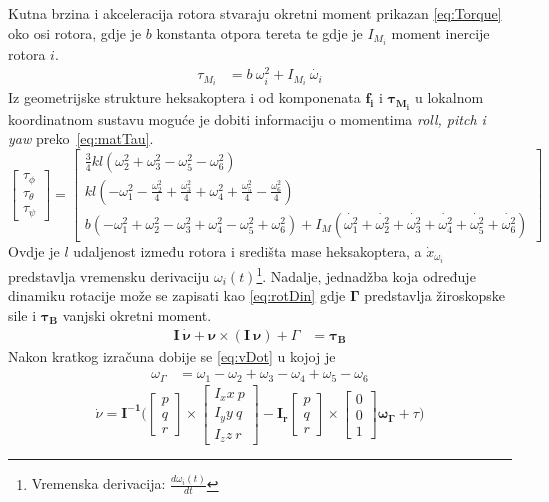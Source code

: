 \documentclass[times, utf8, diplomski]{fer}
\begin{document}
Kutna brzina i akceleracija rotora stvaraju okretni moment prikazan \ref{eq:Torque} oko osi rotora, gdje je $b$ konstanta otpora tereta te gdje je $I_{M_i}$ moment inercije rotora $i$.
\begin{align}
\tau_{M_i}&=b~\omega^2_i+I_{M_i}~\dot{\omega_i} \label{eq:Torque}
\end{align}
Iz geometrijske strukture heksakoptera i od komponenata $\mathbf{f_i}$ i $\mathbf{\tau_{M_i}}$ u lokalnom koordinatnom sustavu moguće je dobiti informaciju o momentima \emph{roll, pitch i yaw} preko~\ref{eq:matTau}.
\begin{equation}
	\begin{bmatrix}
	\tau_{\phi} \\
	\tau_{\theta} \\
	\tau_{\psi}
	\end{bmatrix}
	=
	\begin{bmatrix}
	\frac{3}{4}kl(\omega^2_2+\omega^2_3-\omega^2_5-\omega^2_6) \\
	kl(-\omega^2_1-\frac{\omega^2_2}{4}+\frac{\omega^2_3}{4}+\omega^2_4+\frac{\omega^2_5}{4}-\frac{\omega^2_6}{4}) \\
	b(-\omega^2_1+\omega^2_2-\omega^2_3+\omega^2_4-\omega^2_5+\omega^2_6)+I_M(\dot{\omega^2_1}+\dot{\omega^2_2}+\dot{\omega^2_3}+\dot{\omega^2_4}+\dot{\omega^2_5}+\dot{\omega^2_6})
	\end{bmatrix}
	\label{eq:matTau}
\end{equation}
Ovdje je $l$ udaljenost između rotora i središta mase heksakoptera, a $\dot{x}_{\omega_i}$ predstavlja vremensku derivaciju $\omega_i(t)$\footnote{Vremenska derivacija: $\frac{d\omega_i(t)}{dt}$}. Nadalje, jednadžba koja određuje dinamiku rotacije može se zapisati kao \ref{eq:rotDin} gdje $\mathbf{\Gamma}$ predstavlja žiroskopske sile i $\mathbf{\tau_B}$ vanjski okretni moment.
\begin{align}
\mathbf{I~\dot{\nu}+\nu\times(I~\nu)}+\Gamma&=\mathbf{\tau_B} \label{eq:rotDin}
\end{align}
Nakon kratkog izračuna dobije se \ref{eq:vDot} u kojoj je 
\begin{align}
\omega_{\Gamma} &= \omega_1-\omega_2+\omega_3-\omega_4+\omega_5-\omega_6 \label{eq:omegaV}
\end{align}
\begin{equation}
	\dot{\nu} = \mathbf{I^{-1}} \Bigg(
	\begin{bmatrix}
	p \\
	q \\
	r
	\end{bmatrix}
	\times
	\begin{bmatrix}
	I_xx~p \\
	I_yy~q \\
	I_zz~r
	\end{bmatrix}
	-\mathbf{I_r}
	\begin{bmatrix}
	p \\
	q \\
	r
	\end{bmatrix}
	\times
	\begin{bmatrix}
	0 \\
	0 \\
	1
	\end{bmatrix}
	\mathbf{\omega_{\Gamma}}+\tau
	\Bigg)
	\label{eq:vDot}
\end{equation}
\end{document}
